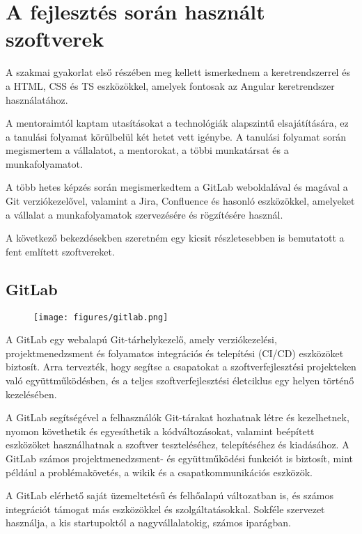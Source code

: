 \section*{A fejlesztés során használt szoftverek}
A szakmai gyakorlat első részében meg kellett ismerkednem a keretrendszerrel és a HTML, CSS és TS  eszközökkel, amelyek fontosak az Angular keretrendszer használatához. 
\par A mentoraimtól kaptam utasításokat a technológiák alapszintű elsajátítására, ez a tanulási folyamat körülbelül két hetet vett igénybe. A tanulási folyamat során megismertem a vállalatot, a mentorokat, a többi munkatársat és a munkafolyamatot.
\par A több hetes képzés során megismerkedtem a GitLab weboldalával és magával a Git verziókezelővel, valamint a Jira, Confluence és hasonló eszközökkel, amelyeket a vállalat a munkafolyamatok szervezésére és rögzítésére használ.
\par A következő bekezdésekben szeretném egy kicsit részletesebben is bemutatott a fent említett szoftvereket.
\subsection*{GitLab}
\begin{figure}[H]
    \centering
    \texttt{[image: figures/gitlab.png]}
\end{figure}
\par A GitLab egy webalapú Git-tárhelykezelő, amely verziókezelési, projektmenedzsment és folyamatos integrációs és telepítési (CI/CD) eszközöket biztosít. Arra tervezték, hogy segítse a csapatokat a szoftverfejlesztési projekteken való együttműködésben, és a teljes szoftverfejlesztési életciklus egy helyen történő kezelésében.
\par A GitLab segítségével a felhasználók Git-tárakat hozhatnak létre és kezelhetnek, nyomon követhetik és egyesíthetik a kódváltozásokat, valamint beépített eszközöket használhatnak a szoftver teszteléséhez, telepítéséhez és kiadásához. A GitLab számos projektmenedzsment- és együttműködési funkciót is biztosít, mint például a problémakövetés, a wikik és a csapatkommunikációs eszközök.
\par A GitLab elérhető saját üzemeltetésű és felhőalapú változatban is, és számos integrációt támogat más eszközökkel és szolgáltatásokkal. Sokféle szervezet használja, a kis startupoktól a nagyvállalatokig, számos iparágban.
